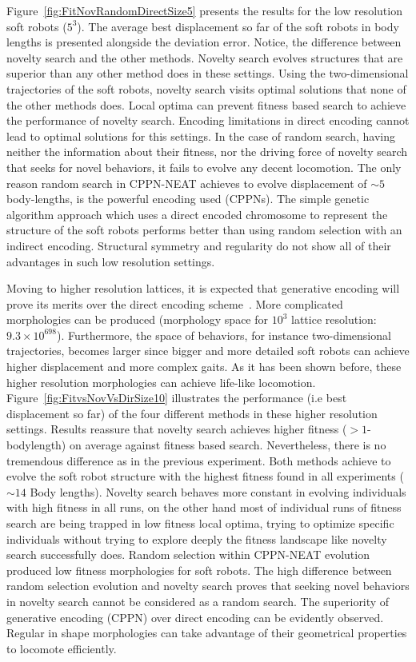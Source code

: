 \documentclass{sig-alternate}
\begin{document}
Figure~\ref{fig:FitNovRandomDirectSize5} presents the results for the low resolution soft robots ($5^3$). The average best displacement so far of the soft robots in body lengths is presented alongside the deviation error. Notice, the difference between novelty search and the other methods. Novelty search evolves structures that are superior than any other method does in these settings. Using the two-dimensional trajectories of the soft robots, novelty search visits optimal solutions that none of the other methods does. Local optima can prevent fitness based search to achieve the performance of novelty search. Encoding limitations in direct encoding cannot lead to optimal solutions for this settings. In the case of random search, having neither the information about their fitness, nor the driving force of novelty search that seeks for novel behaviors, it fails to evolve any decent locomotion. The only reason random search in CPPN-NEAT achieves to evolve displacement of $\sim 5$ body-lengths, is the powerful encoding used (CPPNs). The simple genetic algorithm approach which uses a direct encoded chromosome to represent the structure of the soft robots performs better than using random selection with an indirect encoding. Structural symmetry and regularity do not show all of their advantages in such low resolution settings.

Moving to higher resolution lattices, it is expected that generative encoding will prove its merits over the direct encoding scheme~\cite{cheney2013unshackling,stanley2007compositional}. More complicated morphologies can be produced (morphology space for $10^3$ lattice resolution: $9.3 \times 10^{698}$). Furthermore, the space of behaviors, for instance two-dimensional trajectories, becomes larger since bigger and more detailed soft robots can achieve higher displacement and more complex gaits. As it has been shown before, these higher resolution morphologies can achieve life-like locomotion. Figure~\ref{fig:FitvsNovVsDirSize10} illustrates the performance (i.e best displacement so far) of the four different methods in these higher resolution settings. Results reassure that novelty search achieves higher fitness ($> 1$-bodylength) on average against fitness based search. Nevertheless, there is no tremendous difference as in the previous experiment. Both methods achieve to evolve the soft robot structure with the highest fitness found in all experiments ($\sim 14$ Body lengths). Novelty search behaves more constant in evolving individuals with high fitness in all runs, on the other hand most of individual runs of fitness search are being trapped in low fitness local optima, trying to optimize specific individuals without trying to explore deeply the fitness landscape like novelty search successfully does. Random selection within CPPN-NEAT evolution produced low fitness morphologies for soft robots. The high difference between random selection evolution and novelty search proves that seeking novel behaviors in novelty search cannot be considered as a random search. The superiority of generative encoding (CPPN) over direct encoding can be evidently observed. Regular in shape morphologies can take advantage of their geometrical properties to locomote efficiently.
\end{document}
